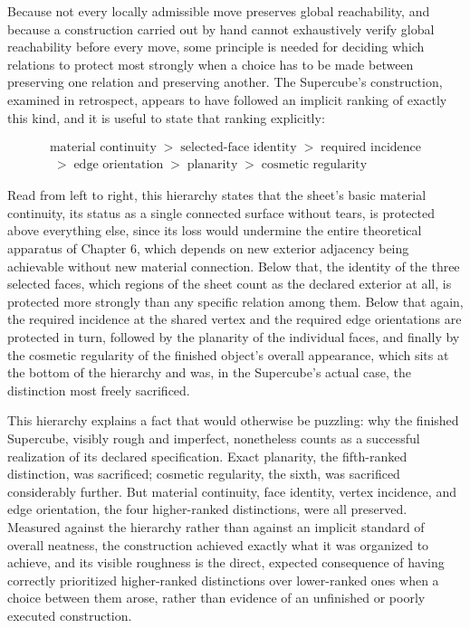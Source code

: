 \documentclass[11pt,oneside]{book}
\begin{document}
Because not every locally admissible move preserves global reachability,
and because a construction carried out by hand cannot exhaustively
verify global reachability before every move, some principle is needed
for deciding which relations to protect most strongly when a choice has
to be made between preserving one relation and preserving another. The
Supercube's construction, examined in retrospect, appears to have
followed an implicit ranking of exactly this kind, and it is useful to
state that ranking explicitly:

\begin{gather*}
\text{material continuity} \;>\; \text{selected-face identity} \;>\; \text{required incidence} \\
{}\;>\; \text{edge orientation} \;>\; \text{planarity} \;>\; \text{cosmetic regularity}
\end{gather*}

Read from left to right, this hierarchy states that the sheet's basic
material continuity, its status as a single connected surface without
tears, is protected above everything else, since its loss would
undermine the entire theoretical apparatus of Chapter 6, which depends
on new exterior adjacency being achievable without new material
connection. Below that, the identity of the three selected faces, which
regions of the sheet count as the declared exterior at all, is protected
more strongly than any specific relation among them. Below that again,
the required incidence at the shared vertex and the required edge
orientations are protected in turn, followed by the planarity of the
individual faces, and finally by the cosmetic regularity of the finished
object's overall appearance, which sits at the bottom of the hierarchy
and was, in the Supercube's actual case, the distinction most freely
sacrificed.

This hierarchy explains a fact that would otherwise be puzzling: why the
finished Supercube, visibly rough and imperfect, nonetheless counts as a
successful realization of its declared specification. Exact planarity,
the fifth-ranked distinction, was sacrificed; cosmetic regularity, the
sixth, was sacrificed considerably further. But material continuity,
face identity, vertex incidence, and edge orientation, the four
higher-ranked distinctions, were all preserved. Measured against the
hierarchy rather than against an implicit standard of overall neatness,
the construction achieved exactly what it was organized to achieve, and
its visible roughness is the direct, expected consequence of having
correctly prioritized higher-ranked distinctions over lower-ranked ones
when a choice between them arose, rather than evidence of an unfinished
or poorly executed construction.
\end{document}
